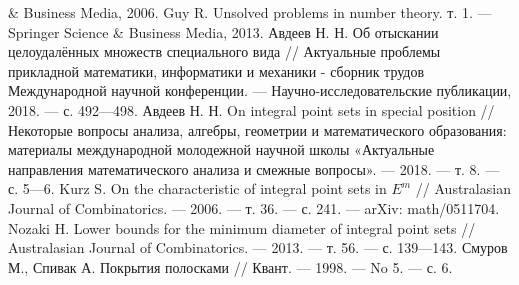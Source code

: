 \begin{thebibliography}{99}
\& Business Media, 2006.
Guy R. Unsolved problems in number theory. т. 1. — Springer Science \& Business Media,
2013.
Авдеев Н. Н. Об отыскании целоудалённых множеств специального вида // Актуальные
проблемы прикладной математики, информатики и механики - сборник трудов Международной
научной конференции. — Научно-исследовательские публикации, 2018. — с. 492—498.
Авдеев Н. Н. On integral point sets in special position // Некоторые вопросы анализа,
алгебры, геометрии и математического образования: материалы международной молодежной
научной школы «Актуальные направления математического анализа и смежные вопросы». —
2018. — т. 8. — с. 5—6.
Kurz S. On the characteristic of integral point sets in $E^m$ // Australasian Journal of
Combinatorics. — 2006. — т. 36. — с. 241. — arXiv: math/0511704.
Nozaki H. Lower bounds for the minimum diameter of integral point sets // Australasian
Journal of Combinatorics. — 2013. — т. 56. — с. 139—143.
Смуров М., Спивак А. Покрытия полосками // Квант. — 1998. — No 5. — с. 6.
\end{thebibliography}
